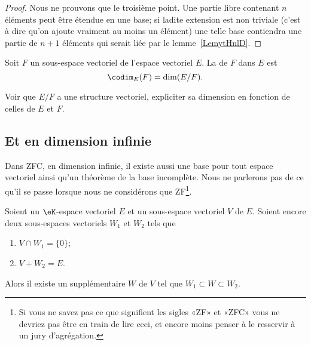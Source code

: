 \begin{proof}
    Nous ne prouvons que le troisième point. Une partie libre contenant \( n\) éléments peut être étendue en une base; si ladite extension est non triviale (c'est à dire qu'on ajoute vraiment au moins un élément) une telle base contiendra une partie de \( n+1\) éléments qui serait liée par le lemme~\ref{LemytHnlD}.
\end{proof}

\begin{definition}\label{DefCodimension}
Soit \( F\) un sous-espace vectoriel de l'espace vectoriel \( E\). La  de \( F\) dans \( E\) est
\begin{equation}
    \codim_E(F)=\dim(E/F).
\end{equation}
\end{definition}

\begin{probleme}
Voir que $E/F$ a une structure vectoriel, expliciter sa dimension en fonction de celles de $E$ et $F$.
\end{probleme}

\subsection{Et en dimension infinie}

Dans ZFC, en dimension infinie, il existe aussi une base pour tout espace vectoriel ainsi qu'un théorème de la base incomplète. Nous ne parlerons pas de ce qu'il se passe lorsque nous ne considérons que ZF\footnote{Si vous ne savez pas ce que signifient les sigles «ZF» et «ZFC» vous ne devriez pas être en train de lire ceci, et encore moins penser à le resservir à un jury d'agrégation.}.

\begin{lemma}        \label{LEMooSSRXooIyfgNz}
    Soient un \( \eK\)-espace vectoriel \( E\) et un sous-espace vectoriel \( V\) de \( E\). Soient encore deux sous-espaces vectoriels \( W_1\) et \( W_2\) tels que
    \begin{enumerate}
        \item
            \( V\cap W_1=\{ 0 \}\);
        \item
            \( V+W_2=E\).
    \end{enumerate}
    Alors il existe un supplémentaire \( W\) de \( V\) tel que \( W_1\subset W\subset W_2\).
\end{lemma}


